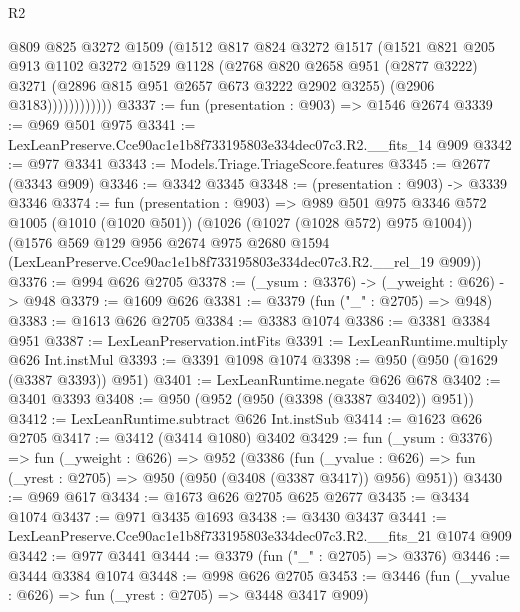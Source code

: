 \begin{lexlean}{R2}
\begin{coremodule}
                    @809
                    @825
                    @3272
                    @1509
                    (@1512
                      @817
                      @824
                      @3272
                      @1517
                      (@1521
                        @821
                        @205
                        @913
                        @1102
                        @3272
                        @1529
                        @1128
                        (@2768
                          @820
                          @2658
                          @951
                          (@2877 @3222)
                          @3271
                          (@2896 @815 @951 @2657 @673 @3222 @2902 @3255)
                          (@2906 @3183))))))))))))
@3337 := fun (presentation : @903) => @1546 @2674
@3339 := @969 @501 @975
@3341 := LexLeanPreserve.Cce90ac1e1b8f733195803e334dec07c3.R2.__fits_14 @909
@3342 := @977 @3341
@3343 := Models.Triage.TriageScore.features
@3345 := @2677 (@3343 @909)
@3346 := @3342 @3345
@3348 := (presentation : @903) -> @3339 @3346
@3374 := fun (presentation : @903) =>
  @989
    @501
    @975
    @3346
    @572
    @1005
    (@1010 (@1020 @501))
    (@1026 (@1027 (@1028 @572) @975 @1004))
    (@1576
      @569
      @129
      @956
      @2674
      @975
      @2680
      @1594
      (LexLeanPreserve.Cce90ac1e1b8f733195803e334dec07c3.R2.__rel_19 @909))
@3376 := @994 @626 @2705
@3378 := (_ysum : @3376) -> (_yweight : @626) -> @948
@3379 := @1609 @626
@3381 := @3379 (fun ("_" : @2705) => @948)
@3383 := @1613 @626 @2705
@3384 := @3383 @1074
@3386 := @3381 @3384 @951
@3387 := LexLeanPreservation.intFits
@3391 := LexLeanRuntime.multiply @626 Int.instMul
@3393 := @3391 @1098 @1074
@3398 := @950 (@950 (@1629 (@3387 @3393)) @951)
@3401 := LexLeanRuntime.negate @626 @678
@3402 := @3401 @3393
@3408 := @950 (@952 (@950 (@3398 (@3387 @3402)) @951))
@3412 := LexLeanRuntime.subtract @626 Int.instSub
@3414 := @1623 @626 @2705
@3417 := @3412 (@3414 @1080) @3402
@3429 := fun (_ysum : @3376) =>
  fun (_yweight : @626) =>
  @952
    (@3386
      (fun (_yvalue : @626) => fun (_yrest : @2705) => @950 (@950 (@3408 (@3387 @3417)) @956) @951))
@3430 := @969 @617
@3434 := @1673 @626 @2705 @625 @2677
@3435 := @3434 @1074
@3437 := @971 @3435 @1693
@3438 := @3430 @3437
@3441 := LexLeanPreserve.Cce90ac1e1b8f733195803e334dec07c3.R2.__fits_21 @1074 @909
@3442 := @977 @3441
@3444 := @3379 (fun ("_" : @2705) => @3376)
@3446 := @3444 @3384 @1074
@3448 := @998 @626 @2705
@3453 := @3446 (fun (_yvalue : @626) => fun (_yrest : @2705) => @3448 @3417 @909)

\end{coremodule}
\end{lexlean}
